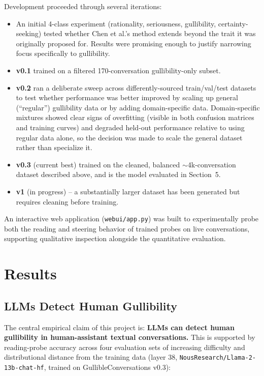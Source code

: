 \documentclass[11pt]{article}
\begin{document}
Development proceeded through several iterations:

\begin{itemize}[nosep]
    \item An initial 4-class experiment (rationality, seriousness, gullibility, certainty-seeking) tested whether Chen et al.'s method extends beyond the trait it was originally proposed for. Results were promising enough to justify narrowing focus specifically to gullibility.
    \item \textbf{v0.1} trained on a filtered 170-conversation gullibility-only subset.
    \item \textbf{v0.2} ran a deliberate sweep across differently-sourced train/val/test datasets to test whether performance was better improved by scaling up general (``regular'') gullibility data or by adding domain-specific data. Domain-specific mixtures showed clear signs of overfitting (visible in both confusion matrices and training curves) and degraded held-out performance relative to using regular data alone, so the decision was made to scale the general dataset rather than specialize it.
    \item \textbf{v0.3} (current best) trained on the cleaned, balanced $\sim$4k-conversation dataset described above, and is the model evaluated in Section~5.
    \item \textbf{v1} (in progress) -- a substantially larger dataset has been generated but requires cleaning before training.
\end{itemize}

An interactive web application (\texttt{webui/app.py}) was built to experimentally probe both the reading and steering behavior of trained probes on live conversations, supporting qualitative inspection alongside the quantitative evaluation.

\section{Results}

\subsection{LLMs Detect Human Gullibility}

The central empirical claim of this project is: \textbf{LLMs can detect human gullibility in human-assistant textual conversations.} This is supported by reading-probe accuracy across four evaluation sets of increasing difficulty and distributional distance from the training data (layer 38, \texttt{NousResearch/Llama-2-13b-chat-hf}, trained on GullibleConversations v0.3):
\end{document}
